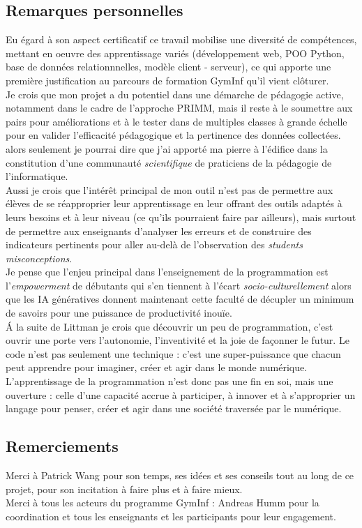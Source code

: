 \documentclass[11pt,a4paper]{article}
\let\cite\parencite
\begin{document}
\subsection*{Remarques personnelles}
Eu égard à son aspect certificatif ce travail mobilise une diversité de compétences, mettant en oeuvre des apprentissage variés (développement web, POO Python, base de données relationnnelles, modèle client - serveur), ce qui apporte une première justification au parcours de formation GymInf qu'il vient clôturer.\\
Je crois que mon projet a du potentiel dans une démarche de pédagogie active, notamment dans le cadre de l'approche PRIMM, mais il reste à le soumettre aux pairs pour améliorations et à le tester dans de multiples classes à grande échelle pour en valider l'efficacité pédagogique et la pertinence des données collectées. alors seulement je pourrai dire que j'ai apporté ma pierre à l'édifice dans la constitution d'une communauté \textit{scientifique} de praticiens de la pédagogie de l'informatique. \\
Aussi je crois que l'intérêt principal de mon outil n'est pas de permettre aux élèves de se réapproprier leur apprentissage en leur offrant des outils adaptés à leurs besoins et à leur niveau (ce qu'ils pourraient faire par ailleurs), mais surtout de permettre aux enseignants d'analyser les erreurs et de construire des indicateurs pertinents pour aller au-delà de l'observation des \textit{students misconceptions}.\\
Je pense que l'enjeu principal dans l'enseignement de la programmation est l'\textit{empowerment} de débutants qui s'en tiennent à l'écart \textit{socio-culturellement} alors que les IA génératives donnent maintenant cette faculté de décupler un minimum de savoirs pour une puissance de productivité inouïe.\\
\'{A} la suite de Littman \cite{codetojoy} je crois que découvrir un peu de programmation, c'est ouvrir une porte vers l'autonomie, l'inventivité et la joie de façonner le futur. Le code n'est pas seulement une technique : c'est une super-puissance que chacun peut apprendre pour imaginer, créer et agir dans le monde numérique. L'apprentissage de la programmation n'est donc pas une fin en soi, mais une ouverture : celle d'une capacité accrue à participer, à innover et à s'approprier un langage pour penser, créer et agir dans une société traversée par le numérique.


\subsection*{Remerciements}
Merci à Patrick Wang pour son temps, ses idées et ses conseils tout au long de ce projet, pour son incitation à faire plus et à faire mieux.\\
Merci à tous les acteurs du programme GymInf : Andreas Humm pour la coordination et tous les enseignants et les participants pour leur engagement.
\end{document}
